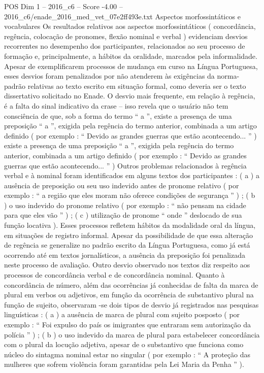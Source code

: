\begin{textsample}{POS Dim 1 – 2016\_c6 – Score -4.00 – 2016\_c6/enade\_2016\_med\_vet\_07e2ff493e.txt}
Aspectos morfossintáticos e vocabulares Os resultados relativos aos aspectos morfossintáticos ( concordância, regência, colocação de pronomes, flexão nominal e verbal ) evidenciam desvios recorrentes no desempenho dos participantes, relacionados ao seu processo de formação e, principalmente, a hábitos da oralidade, marcados pela informalidade.
Apesar de exemplificarem processos de mudança em curso na Língua Portuguesa, esses desvios foram penalizados por não atenderem às exigências da norma-padrão relativas ao texto escrito em situação formal, como deveria ser o texto dissertativo solicitado no Enade.
O desvio mais frequente, em relação à regência, é a falta do sinal indicativo da crase – isso revela que o usuário não tem consciência de que, sob a forma do termo “ a ”, existe a presença de uma preposição “ a ”, exigida pela regência do termo anterior, combinada a um artigo definido ( por exemplo : “ Devido as grandes guerras que estão acontecendo... ” ) existe a presença de uma preposição “ a ”, exigida pela regência do termo anterior, combinada a um artigo definido ( por exemplo : “ Devido as grandes guerras que estão acontecendo... ” ) Outros problemas relacionados à regência verbal e à nominal foram identificados em alguns textos dos participantes : ( a ) a ausência de preposição ou seu uso indevido antes de pronome relativo ( por exemplo : “ a região que eles moram não oferece condições de segurança ” ) ; ( b ) o uso indevido do pronome relativo ( por exemplo : “ não pensam na cidade para que eles vão ” ) ; ( c ) utilização de pronome “ onde ” deslocado de sua função locativa ).
Esses processos refletem hábitos da modalidade oral da língua, em situações de registro informal.
Apesar da possibilidade de que essa alteração de regência se generalize no padrão escrito da Língua Portuguesa, como já está ocorrendo até em textos jornalísticos, a ausência da preposição foi penalizada neste processo de avaliação.
Outro desvio observado nos textos diz respeito aos processos de concordância verbal e de concordância nominal.
Quanto à concordância de número, além das ocorrências já conhecidas de falta da marca de plural em verbos ou adjetivos, em função da ocorrência de substantivo plural na função de sujeito, observaram -se dois tipos de desvio já registrados nas pesquisas linguísticas : ( a ) a ausência de marca de plural com sujeito posposto ( por exemplo : “ Foi expulso do país os imigrantes que entraram sem autorização da polícia ” ) ; ( b ) o uso indevido da marca de plural para estabelecer concordância com o plural da locução adjetiva, apesar de o substantivo que funciona como núcleo do sintagma nominal estar no singular ( por exemplo : “ A proteção das mulheres que sofrem violência foram garantidas pela Lei Maria da Penha ” ).

\end{textsample}
